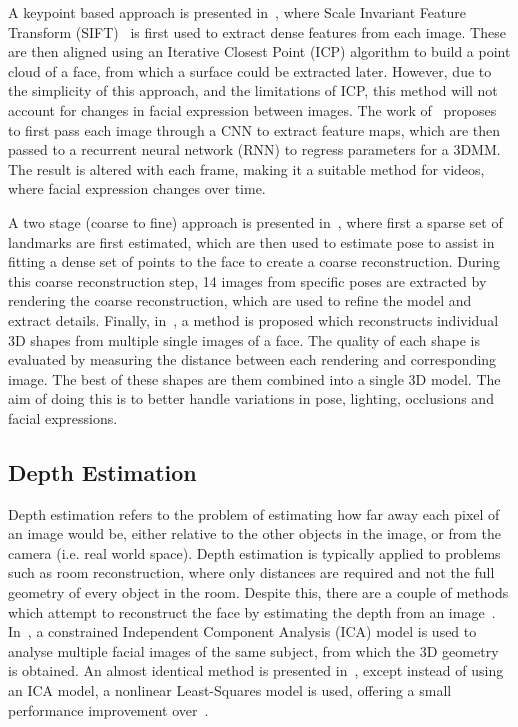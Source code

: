 A keypoint based approach is presented in~\cite{mayo20093d}, where
Scale Invariant Feature Transform (SIFT)~\cite{lowe1999object} is
first used to extract dense features from each image. These are then
aligned using an Iterative Closest Point (ICP) algorithm to build a
point cloud of a face, from which a surface could be extracted
later. However, due to the simplicity of this approach, and the
limitations of ICP, this method will not account for changes in facial
expression between images. The work of~\cite{dou2018multi} proposes to
first pass each image through a CNN to extract feature maps, which are
then passed to a recurrent neural network (RNN) to regress parameters
for a 3DMM. The result is altered with each frame, making it a
suitable method for videos, where facial expression changes over time.

A two stage (coarse to fine) approach is presented
in~\cite{dai2018coarse}, where first a sparse set of landmarks are
first estimated, which are then used to estimate pose to assist in
fitting a dense set of points to the face to create a coarse
reconstruction. During this coarse reconstruction step, 14 images from
specific poses are extracted by rendering the coarse reconstruction,
which are used to refine the model and extract details. Finally,
in~\cite{Piotraschke_2016_CVPR}, a method is proposed which
reconstructs individual 3D shapes from multiple single images of a
face. The quality of each shape is evaluated by measuring the distance
between each rendering and corresponding image. The best of these
shapes are them combined into a single 3D model. The aim of doing this
is to better handle variations in pose, lighting, occlusions and
facial expressions.

\subsection{Depth Estimation}

Depth estimation refers to the problem of estimating how far away each
pixel of an image would be, either relative to the other objects in
the image, or from the camera (i.e. real world space). Depth
estimation is typically applied to problems such as room
reconstruction, where only distances are required and not the full
geometry of every object in the room. Despite this, there are a couple
of methods which attempt to reconstruct the face by estimating the
depth from an image~\cite{sun2011depth,sun2013depth}. In~\cite{sun2011depth}, a
constrained Independent Component Analysis (ICA) model is used to
analyse multiple facial images of the same subject, from which the 3D
geometry is obtained. An almost identical method is presented
in~\cite{sun2013depth}, except instead of using an ICA model, a
nonlinear Least-Squares model is used, offering a small performance
improvement over~\cite{sun2011depth}.


